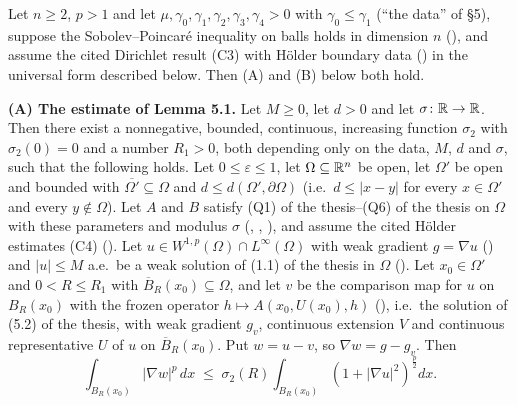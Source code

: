 \begin{lemma}
Let $n\ge2$, $p>1$ and let $\mu,\gamma_0,\gamma_1,\gamma_2,\gamma_3,\gamma_4>0$
with $\gamma_0\le\gamma_1$ (``the data'' of \S5), suppose the
Sobolev--Poincar\'e inequality on balls holds in dimension $n$
(), and assume the cited Dirichlet result (C3)
with H\"older boundary data () in the universal
form described below.  Then (A) and (B) below both hold.

\medskip
\noindent\textbf{(A) The estimate of Lemma 5.1.}  Let $M\ge0$, let $d>0$ and
let $\sigma\colon\mathbb{R}\to\mathbb{R}$.  Then there exist a nonnegative, bounded,
continuous, increasing function $\sigma_2$ with $\sigma_2(0)=0$ and a number
$R_1>0$, both depending only on the data, $M$, $d$ and $\sigma$, such that the
following holds.  Let $0\le\varepsilon\le1$, let $\Omega\subseteq\mathbb{R}^n$ be open,
let $\Omega'$ be open and bounded with $\overline{\Omega'}\subseteq\Omega$ and
$d\le d(\Omega',\partial\Omega)$ (i.e.\ $d\le|x-y|$ for every $x\in\Omega'$ and
every $y\notin\Omega$).  Let $A$ and $B$ satisfy
(Q1) of the thesis--(Q6) of the thesis on $\Omega$ with these parameters and modulus
$\sigma$ (, ,
), and assume the cited H\"older estimates (C4)
().  Let
$u\in W^{1,p}(\Omega)\cap L^\infty(\Omega)$ with weak gradient $g=\nabla u$
() and $|u|\le M$ a.e.\ be a weak solution of (1.1) of the thesis
in $\Omega$ ().  Let $x_0\in\Omega'$ and
$0<R\le R_1$ with $\overline B_R(x_0)\subseteq\Omega$, and let $v$ be the
comparison map for $u$ on $B_R(x_0)$ with the frozen operator
$h\mapsto A(x_0,U(x_0),h)$ (), i.e.\ the solution of
(5.2) of the thesis, with weak gradient $g_v$, continuous extension $V$ and
continuous representative $U$ of $u$ on $\overline B_R(x_0)$.  Put $w=u-v$, so
$\nabla w=g-g_v$.  Then
\[
\int_{B_R(x_0)}|\nabla w|^p\,dx\;\le\;\sigma_2(R)\int_{B_R(x_0)}(1+|\nabla u|^2)^{\frac p2}dx .
\]


\end{lemma}
